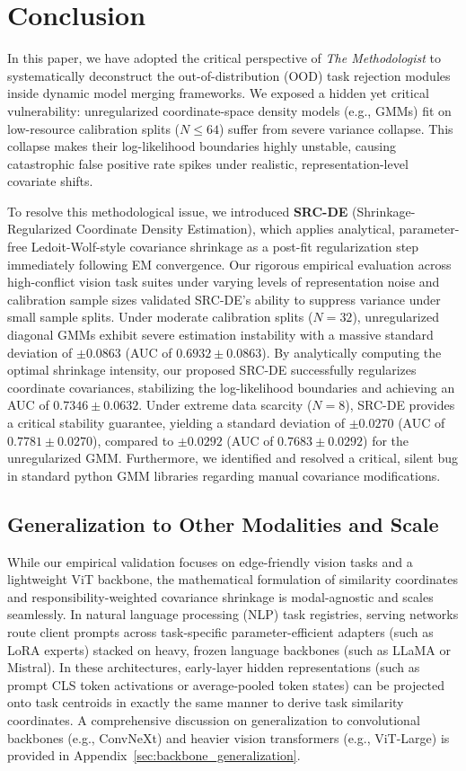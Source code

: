 \section{Conclusion}
\label{submission:sec:conclusion}

In this paper, we have adopted the critical perspective of {\em The Methodologist} to systematically deconstruct the out-of-distribution (OOD) task rejection modules inside dynamic model merging frameworks. We exposed a hidden yet critical vulnerability: unregularized coordinate-space density models (e.g., GMMs) fit on low-resource calibration splits ($N \le 64$) suffer from severe variance collapse. This collapse makes their log-likelihood boundaries highly unstable, causing catastrophic false positive rate spikes under realistic, representation-level covariate shifts. 

To resolve this methodological issue, we introduced {\bf SRC-DE} (Shrinkage-Regularized Coordinate Density Estimation), which applies analytical, parameter-free Ledoit-Wolf-style covariance shrinkage as a post-fit regularization step immediately following EM convergence. Our rigorous empirical evaluation across high-conflict vision task suites under varying levels of representation noise and calibration sample sizes validated SRC-DE's ability to suppress variance under small sample splits. Under moderate calibration splits ($N=32$), unregularized diagonal GMMs exhibit severe estimation instability with a massive standard deviation of $\pm 0.0863$ (AUC of $0.6932 \pm 0.0863$). By analytically computing the optimal shrinkage intensity, our proposed SRC-DE successfully regularizes coordinate covariances, stabilizing the log-likelihood boundaries and achieving an AUC of $0.7346 \pm 0.0632$. Under extreme data scarcity ($N=8$), SRC-DE provides a critical stability guarantee, yielding a standard deviation of $\pm 0.0270$ (AUC of $0.7781 \pm 0.0270$), compared to $\pm 0.0292$ (AUC of $0.7683 \pm 0.0292$) for the unregularized GMM. Furthermore, we identified and resolved a critical, silent bug in standard python GMM libraries regarding manual covariance modifications.

\subsection{Generalization to Other Modalities and Scale}
While our empirical validation focuses on edge-friendly vision tasks and a lightweight ViT backbone, the mathematical formulation of similarity coordinates and responsibility-weighted covariance shrinkage is modal-agnostic and scales seamlessly. In natural language processing (NLP) task registries, serving networks route client prompts across task-specific parameter-efficient adapters (such as LoRA experts) stacked on heavy, frozen language backbones (such as LLaMA or Mistral). In these architectures, early-layer hidden representations (such as prompt CLS token activations or average-pooled token states) can be projected onto task centroids in exactly the same manner to derive task similarity coordinates. A comprehensive discussion on generalization to convolutional backbones (e.g., ConvNeXt) and heavier vision transformers (e.g., ViT-Large) is provided in Appendix~\ref{sec:backbone_generalization}.

